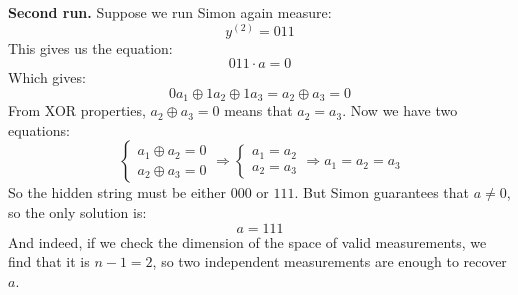 \begin{examplebox}[: $n=3$ and $a = 111$]
    \highspace
    \textbf{Second run.} Suppose we run Simon again measure:
    \begin{equation*}
        y^{(2)} = 011
    \end{equation*}
    This gives us the equation:
    \begin{equation*}
        011 \cdot a = 0
    \end{equation*}
    Which gives:
    \begin{equation*}
        0 a_1 \oplus 1 a_2 \oplus 1 a_3 = a_2 \oplus a_3 = 0
    \end{equation*}
    From XOR properties, $a_2 \oplus a_3 = 0$ means that $a_2 = a_3$. Now we have two equations:
    \begin{equation*}
        \begin{cases}
            a_1 \oplus a_2 = 0 \\
            a_2 \oplus a_3 = 0
        \end{cases}
        \Rightarrow
        \begin{cases}
            a_1 = a_2 \\
            a_2 = a_3
        \end{cases}
        \Rightarrow a_1 = a_2 = a_3
    \end{equation*}
    So the hidden string must be either $000$ or $111$. But Simon guarantees that $a \neq 0$, so the only solution is:
    \begin{equation*}
        a = 111
    \end{equation*}
    And indeed, if we check the dimension of the space of valid measurements, we find that it is $n-1 = 2$, so two independent measurements are enough to recover $a$.
\end{examplebox}